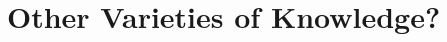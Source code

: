 \documentclass[11pt,letterpaper,oneside]{amsart} %
\begin{document}









\section{Other Varieties of Knowledge?}
\label{varieties}



\end{document}

